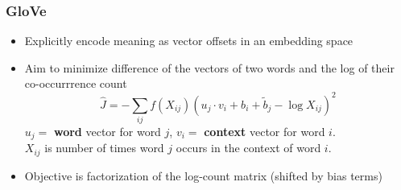 \begin{frame}
\frametitle{GloVe}
\begin{itemize}[<+->]
\item Explicitly encode meaning as vector offsets in an embedding space
\item Aim to minimize difference of the vectors of two words and the log of their co-occurrrence count
\begin{equation*}
\hat{J} = - \sum_{ij} f(X_{ij})  ( u_j \cdot v_i + b_i + \tilde{b}_j - \log X_{ij} )^2 
\end{equation*}
$u_j=$ \textbf{word} vector for word $j$, $v_i=$ \textbf{context} vector for word $i$.\\
$X_{ij}$ is number of times word $j$ occurs in the context of word $i$.
\item Objective is factorization of the log-count matrix (shifted by bias terms)
\end{itemize}
\end{frame}

